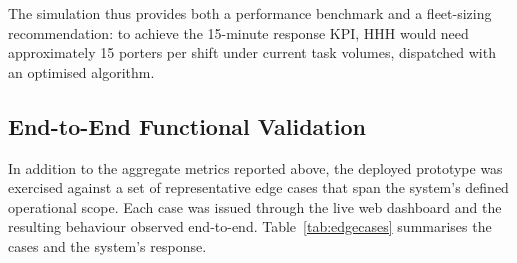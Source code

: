 \documentclass[12pt,a4paper]{article}
\begin{document}
The simulation thus provides both a performance benchmark and a fleet-sizing recommendation: to achieve the 15-minute response KPI, HHH would need approximately 15 porters per shift under current task volumes, dispatched with an optimised algorithm.

\subsection{End-to-End Functional Validation}
\label{sec:edgecases}

In addition to the aggregate metrics reported above, the deployed prototype was exercised against a set of representative edge cases that span the system's defined operational scope. Each case was issued through the live web dashboard and the resulting behaviour observed end-to-end. Table~\ref{tab:edgecases} summarises the cases and the system's response.
\end{document}
